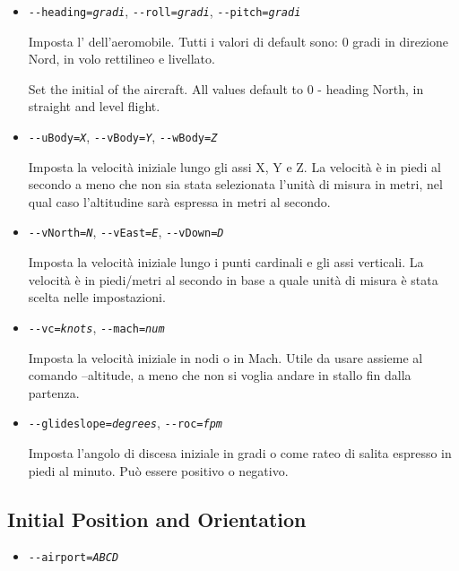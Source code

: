\begin{itemize}
{\begin{itemize}
  \item{\texttt{-$ $-heading={\it gradi}}, \texttt{-$ $-roll={\it gradi}}, \texttt{-$ $-pitch={\it gradi}}}

  Imposta l' dell'aeromobile. Tutti i valori di default sono:
  0 gradi in direzione Nord, in volo rettilineo e livellato.

  Set the initial  of the aircraft. All values default to 0 - heading North, in straight and level flight.

  \item{\texttt{-$ $-uBody={\it X}}, \texttt{-$ $-vBody={\it Y}}, \texttt{-$ $-wBody={\it Z}}}

  Imposta la velocit\`{a} iniziale lungo gli assi X, Y e Z. La velocit\`{a} \`{e} in piedi al secondo a meno che non
  sia stata selezionata l'unit\`{a} di misura in metri, nel qual caso l'altitudine sar\`{a} espressa in metri al secondo.

  \item{\texttt{-$ $-vNorth={\it N}}, \texttt{-$ $-vEast={\it E}}, \texttt{-$ $-vDown={\it D}}}

  Imposta la velocit\`{a} iniziale lungo i punti cardinali e gli assi verticali.
  La velocit\`{a} \`{e} in piedi/metri al secondo in base a quale unit\`{a} di misura \`{e} stata scelta nelle impostazioni.

  \item{\texttt{-$ $-vc={\it knots}}, \texttt{-$ $-mach={\it num}}}

  Imposta la velocit\`{a} iniziale in nodi o in Mach. Utile da usare assieme al comando --altitude, a meno che non
  si voglia andare in stallo fin dalla partenza.

  \item{\texttt{-$ $-glideslope={\it degrees}}, \texttt{-$ $-roc={\it fpm}}}

  Imposta l'angolo di discesa iniziale in gradi o come rateo di salita espresso in piedi al minuto.
  Pu\`{o} essere positivo o negativo.

  \end{itemize}
}
{
  \subsection{Initial Position and Orientation\label{aiportid}}
  \begin{itemize}
  \item{\texttt{-$ $-airport={\it ABCD}}}


\end{itemize}}
\end{itemize}
